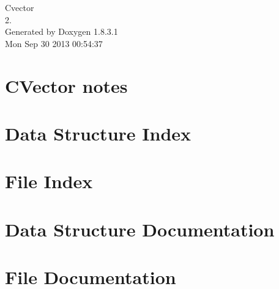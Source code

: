 \documentclass{book}
\begin{document}
\hypersetup{pageanchor=false,citecolor=blue}
\begin{titlepage}
\vspace*{7cm}
\begin{center}
{\Large Cvector \\[1ex]\large 2. }\\
\vspace*{1cm}
{\large Generated by Doxygen 1.8.3.1}\\
\vspace*{0.5cm}
{\small Mon Sep 30 2013 00:54:37}\\
\end{center}
\end{titlepage}
\clearemptydoublepage
{}
\tableofcontents
\clearemptydoublepage
{}
\hypersetup{pageanchor=true,citecolor=blue}
\chapter{C\-Vector notes}
\label{index}\hypertarget{index}{}
\chapter{Data Structure Index}

\chapter{File Index}

\chapter{Data Structure Documentation}









\chapter{File Documentation}






















\printindex
\end{document}
